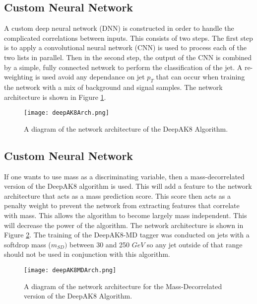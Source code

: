\subsection{Custom Neural Network}

A custom deep neural network (DNN) is constructed in order to handle the complicated correlations between inputs.
This consists of two steps. The first step is to apply a convolutional neural network (CNN) is used to process each of the two lists in parallel.
Then in the second step, the output of the CNN is combined by a simple, fully connected network to perform the classification of the jet.
A re-weighting is used avoid any dependance on jet $p_T$ that can occur when training the network with a mix of background and signal samples.
The network architecture is shown in Figure \ref{fig:fig_4-2}.
\begin{figure} %
    \centering
    \texttt{[image: deepAK8Arch.png]}
    \caption{A diagram of the network architecture of the DeepAK8 Algorithm.}
    \label{fig:fig_4-2}
 \end{figure}
\subsection{Custom Neural Network}
If one wants to use mass as a discriminating variable, then a mass-decorrelated version of the DeepAK8 algorithm is used.
This will add a feature to the network architecture that acts as a mass prediction score. This score then acts as a penalty weight to prevent the network from extracting features that correlate with mass.
This allows the algorithm to become largely mass independent. This will decrease the power of the algorithm. The network architecture is shown in Figure \ref{fig:fig_4-3}.
The training of the DeepAK8-MD tagger was conducted on jets with a softdrop mass ($m_{SD})$ between 30 and 250 $GeV$ so any jet outside of that range should not be used in conjunction with this algorithm.
\begin{figure} %
    \centering
    \texttt{[image: deepAK8MDArch.png]}
    \caption{A diagram of the network architecture for the Mass-Decorrelated version of the DeepAK8 Algorithm.}
    \label{fig:fig_4-3}
 \end{figure}

